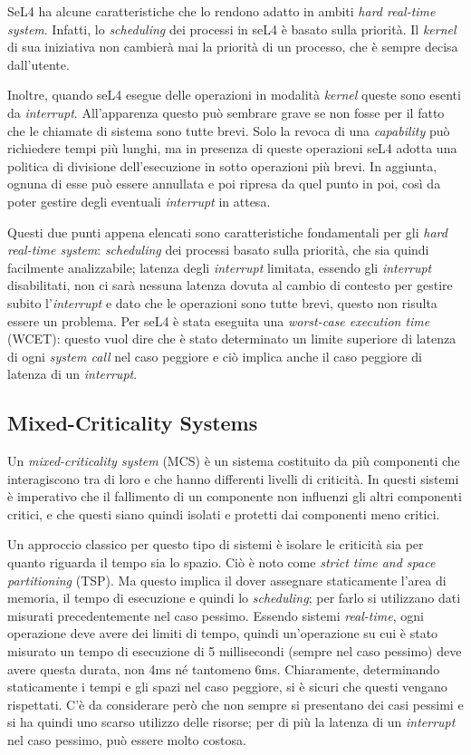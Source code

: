 SeL4 ha alcune caratteristiche che lo rendono adatto in ambiti \textit{hard real-time system}. Infatti, lo \textit{scheduling} dei processi in seL4 è basato sulla priorità. Il \textit{kernel} di sua iniziativa non cambierà mai la priorità di un processo, che è sempre decisa dall'utente.

Inoltre, quando seL4 esegue delle operazioni in modalità \textit{kernel} queste sono esenti da \textit{interrupt}. All'apparenza questo può sembrare grave se non fosse per il fatto che le chiamate di sistema sono tutte brevi. Solo la revoca di una \textit{capability} può richiedere tempi più lunghi, ma in presenza di queste operazioni seL4 adotta una politica di divisione dell'esecuzione in sotto operazioni più brevi. In aggiunta, ognuna di esse può essere annullata e poi ripresa da quel punto in poi, così da poter gestire degli eventuali \textit{interrupt} in attesa.

Questi due punti appena elencati sono caratteristiche fondamentali per gli \textit{hard real-time system}: \textit{scheduling} dei processi basato sulla priorità, che sia quindi facilmente analizzabile; latenza degli \textit{interrupt} limitata, essendo gli \textit{interrupt} disabilitati, non ci sarà nessuna latenza dovuta al cambio di contesto per gestire subito l'\textit{interrupt} e dato che le operazioni sono tutte brevi, questo non risulta essere un problema.
Per seL4 è stata eseguita una \textit{worst-case execution time} (WCET): questo vuol dire che è stato determinato un limite superiore di latenza di ogni \textit{system call} nel caso peggiore e ciò implica anche il caso peggiore di latenza di un \textit{interrupt}.

\subsection{Mixed-Criticality Systems}
Un \textit{mixed-criticality system} (MCS) è un sistema costituito da più componenti che interagiscono tra di loro e che hanno differenti livelli di criticità. In questi sistemi è imperativo che il fallimento di un componente non influenzi gli altri componenti critici, e che questi siano quindi isolati e protetti dai componenti meno critici.

Un approccio classico per questo tipo di sistemi è isolare le criticità sia per quanto riguarda il tempo sia lo spazio. Ciò è noto come \textit{strict time and space partitioning} (TSP). Ma questo implica il dover assegnare staticamente l'area di memoria, il tempo di esecuzione e quindi lo \textit{scheduling}; per farlo si utilizzano dati misurati precedentemente nel caso pessimo. Essendo sistemi \textit{real-time}, ogni operazione deve avere dei limiti di tempo, quindi un'operazione su cui è stato misurato un tempo di esecuzione di 5 millisecondi (sempre nel caso pessimo) deve avere questa durata, non 4ms né tantomeno 6ms. Chiaramente, determinando staticamente i tempi e gli spazi nel caso peggiore, si è sicuri che questi vengano rispettati. C'è da considerare però che non sempre si presentano dei casi pessimi e si ha quindi uno scarso utilizzo delle risorse; per di più la latenza di un \textit{interrupt} nel caso pessimo, può essere molto costosa.

